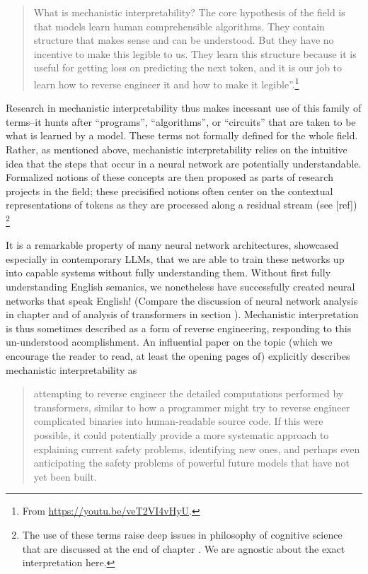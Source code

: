 \begin{quote}
What is mechanistic interpretability? The core hypothesis of the field is that
models learn human comprehensible algorithms. They contain structure that makes
sense and can be understood. But they have no incentive to make this legible to
us. They learn this structure because it is useful for getting loss on
predicting the next token, and it is our job to learn how to reverse engineer
it and how to make it
legible''.\footnote{From \url{https://youtu.be/veT2VI4vHyU}.}
\end{quote}

Research in mechanistic interpretability thus makes incessant use of this
family of terms--it hunts after ``programs'', ``algorithms'', or ``circuits''
that are taken to be what is learned by a model. These terms not formally
defined for the whole field. Rather, as mentioned above, mechanistic
interpretability relies on the intuitive idea that the steps that occur in a
neural network are potentially understandable. Formalized notions of these
concepts are then proposed as parts of research projects in the field; these
precisified notions often center on the contextual representations of tokens as
they are processed along a residual stream (see [ref]) \footnote{The use of
these terms raise deep issues in philosophy of cognitive science that are
discussed at the end of chapter .  We are agnostic
about the exact interpretation here.}

It is a remarkable property of many neural network architectures, showcased
especially in contemporary LLMs, that we are able to train these networks up
into capable systems without fully understanding them. Without first fully
understanding English semanics, we nonetheless have successfully created neural
networks that speak English! (Compare the discussion of neural network analysis
in chapter  and of analysis of transformers in section
). Mechanistic interpretation is thus sometimes described as
a form of reverse engineering, responding to this un-understood acomplishment.
An influential paper on the topic (which we encourage the reader to read, at
least the opening pages of) explicitly describes mechanistic interpretability
as

\begin{quote}
attempting to reverse engineer the detailed computations performed by
transformers, similar to how a programmer might try to reverse engineer
complicated binaries into human-readable source code.  If this were possible,
it could potentially provide a more systematic approach to explaining current
safety problems, identifying new ones, and perhaps even anticipating the safety
problems of powerful future models that have not yet been
built.\cite{elhage2021mathematical} 
\end{quote}


